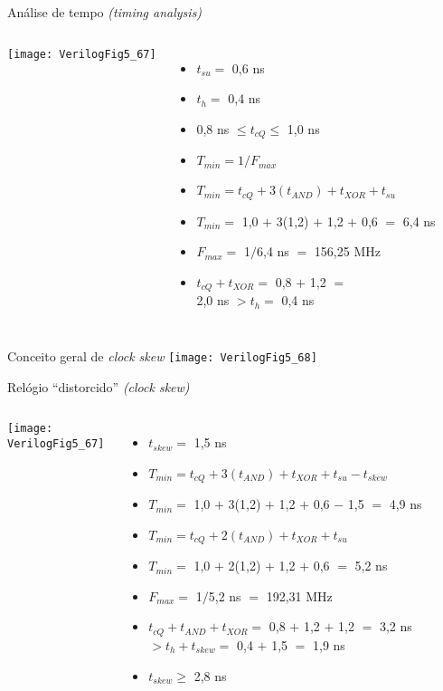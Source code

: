 \begin{frame}{Análise de tempo \textit{(timing analysis)}}   \centering
	\begin{columns}
            \vspace{0.25cm}
            \texttt{[image: VerilogFig5\_67]} 
            \begin{itemize}
                \item $t_{su} =$ 0,6 ns
                \item $t_h =$ 0,4 ns
                \item 0,8 ns $\leq t_{cQ} \leq$ 1,0 ns
                \pause
                \item $T_{min} = 1/F_{max}$ 
                \item $T_{min} = t_{cQ} + 3(t_{AND}) + t_{XOR} + t_{su}$ 
                \item $T_{min} = $ 1,0 $+$ 3(1,2) $+$ 1,2 $+$ 0,6 $=$ 6,4 ns 
                \item $F_{max} = $ 1$/$6,4 ns $=$ 156,25 MHz
                \pause
                \item $t_{cQ} + t_{XOR} = $ 0,8 $+$ 1,2 $=$ \\ 2,0 ns $> t_h =$ 0,4 ns
            \end{itemize}
    \end{columns}
\end{frame}

\begin{frame}{Conceito geral de \textit{clock skew}} \centering
    \texttt{[image: VerilogFig5\_68]} 
\end{frame}

\begin{frame}{Relógio ``distorcido'' \textit{(clock skew)}}   \centering
	\begin{columns}
            \vspace{0.5cm}
            \texttt{[image: VerilogFig5\_67]} 
            \begin{itemize}
                \item $t_{skew} =$ 1,5 ns
                \item $T_{min} = t_{cQ} + 3(t_{AND}) + t_{XOR} + t_{su} - t_{skew}$ 
                \item $T_{min} = $ 1,0 $+$ 3(1,2) $+$ 1,2 $+$ 0,6 $-$ 1,5 $=$ 4,9 ns 
                \item $T_{min} = t_{cQ} + 2(t_{AND}) + t_{XOR} + t_{su}$ 
                \item $T_{min} = $ 1,0 $+$ 2(1,2) $+$ 1,2 $+$ 0,6 $=$ 5,2 ns 
                \item $F_{max} = $ 1$/$5,2 ns $=$ 192,31 MHz
                \pause
                \item $t_{cQ} + t_{AND} + t_{XOR} = $ 0,8 $+$ 1,2 $+$ 1,2 $=$ 3,2 ns $> t_h + t_{skew} = $ 0,4 $+$ 1,5 $=$ 1,9 ns
                \item $t_{skew} \geq $ 2,8 ns
            \end{itemize}
    \end{columns}
\end{frame}

